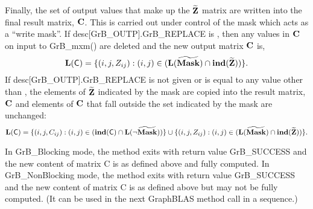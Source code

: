 Finally, the set of output values that make up the ${\bf \widetilde{Z}}$ matrix are written into the final result matrix, ${\bf C}$. 
This is carried out under control of the mask which acts as a ``write mask''.
If {\sf desc[GrB\_OUTP].GrB\_REPLACE} is \true, then any values in ${\bf C}$ on input to {\sf GrB\_mxm()} are deleted and the new
output matrix ${\bf C}$ is,
\[ \bold{L}({\sf C}) = \{(i,j,Z_{ij}) : (i,j) \in (\bold{L}({\bf \widetilde{Mask}}) \cap \bold{ind}({\bf \widetilde{Z}})) \}. \]
If {\sf desc[GrB\_OUTP].GrB\_REPLACE} is not given or is equal to any value other than \true, the elements of ${\bf \widetilde{Z}}$ indicated by the mask
are copied into the result matrix, ${\bf C}$ and elements of ${\bf C}$  that fall outside the set indicated by the mask are unchanged:
\[ \bold{L}({\sf C}) = \{(i,j,C_{ij}) : (i,j) \in (\bold{ind}({\bf \sf C}) \cap \bold{L}(\neg {\bf \widetilde{Mask}})) \} \cup \{(i,j,Z_{ij}) : (i,j) \in (\bold{L}({\bf \widetilde{Mask}}) \cap \bold{ind}({\bf \widetilde{Z}})) \}. \]

In {\sf GrB\_Blocking} mode, the method exits with return value {\sf GrB\_SUCCESS} and the new content of matrix {\sf C} is as defined above and fully computed.
In {\sf GrB\_NonBlocking} mode, the method exits with return value {\sf GrB\_SUCCESS} and the new content of matrix {\sf C} is as defined above but may not be fully computed. (It can be used in the next GraphBLAS method call in a sequence.)

